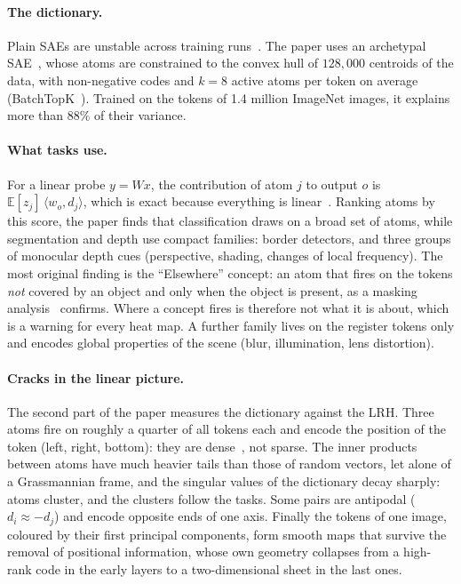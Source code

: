 \documentclass[sigconf,nonacm,screen]{acmart}
\begin{document}
\paragraph{The dictionary.} Plain SAEs are unstable across training runs~\cite{paulo2025sparse}. The paper
uses an archetypal SAE~\cite{fel2025archetypal}, whose atoms are constrained to the convex hull of
$128{,}000$ centroids of the data, with non-negative codes and $k=8$ active atoms per token on average
(BatchTopK~\cite{bussmann2024batchtopk}). Trained on the tokens of 1.4 million ImageNet images, it explains
more than 88\% of their variance.

\paragraph{What tasks use.} For a linear probe $y=Wx$, the contribution of atom $j$ to output $o$ is
$\mathbb{E}[z_j]\,\langle w_o,d_j\rangle$, which is exact because everything is
linear~\cite{fel2023holistic}. Ranking atoms by this score, the paper finds that classification draws on a
broad set of atoms, while segmentation and depth use compact families: border detectors, and three groups
of monocular depth cues (perspective, shading, changes of local frequency). The most original finding is
the ``Elsewhere'' concept: an atom that fires on the tokens \emph{not} covered by an object and only when
the object is present, as a masking analysis~\cite{petsiuk2018rise} confirms. Where a concept fires is
therefore not what it is about, which is a warning for every heat map. A further family lives on the
register tokens only and encodes global properties of the scene (blur, illumination, lens distortion).

\paragraph{Cracks in the linear picture.} The second part of the paper measures the dictionary against the
LRH. Three atoms fire on roughly a quarter of all tokens each and encode the position of the token (left,
right, bottom): they are dense~\cite{sun2025dense}, not sparse. The inner products between atoms have much
heavier tails than those of random vectors, let alone of a Grassmannian frame, and the singular values
of the dictionary decay sharply: atoms cluster, and the clusters follow the tasks. Some pairs are
antipodal ($d_i\approx-d_j$) and encode opposite ends of one axis. Finally the tokens of one image, coloured
by their first principal components, form smooth maps that survive the removal of positional information,
whose own geometry collapses from a high-rank code in the early layers to a two-dimensional sheet in the
last ones.
\end{document}
